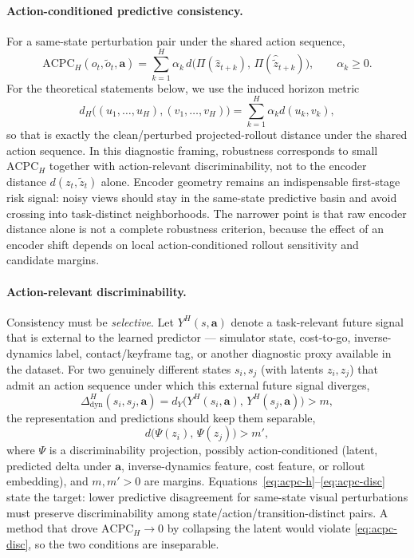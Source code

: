\documentclass[10pt]{article}
\begin{document}
\paragraph{Action-conditioned predictive consistency.} For a same-state perturbation pair under the shared action sequence,
\begin{equation}
  \mathrm{ACPC}_H(o_t, \tilde o_t, \mathbf a)
  = \sum_{k=1}^{H} \alpha_k \, d\!\big(\Pi(\hat z_{t+k}),\, \Pi(\hat{\tilde z}_{t+k})\big),
  \qquad \alpha_k \ge 0 .
  \label{eq:acpc-h}
\end{equation}
For the theoretical statements below, we use the induced horizon metric
\begin{equation}
  d_H\big((u_1,\ldots,u_H),(v_1,\ldots,v_H)\big)
  = \sum_{k=1}^{H}\alpha_k d(u_k,v_k),
  \label{eq:acpc-horizon-metric}
\end{equation}
so that  is exactly the clean/perturbed projected-rollout distance under the shared action sequence.
In this diagnostic framing, robustness corresponds to small $\mathrm{ACPC}_H$ together with action-relevant discriminability, not to the encoder distance $d(z_t, \tilde z_t)$ alone. Encoder geometry remains an indispensable first-stage risk signal: noisy views should stay in the same-state predictive basin and avoid crossing into task-distinct neighborhoods. The narrower point is that raw encoder distance alone is not a complete robustness criterion, because the effect of an encoder shift depends on local action-conditioned rollout sensitivity and candidate margins.

\paragraph{Action-relevant discriminability.} Consistency must be \emph{selective}. Let $Y^{H}(s,\mathbf a)$ denote a task-relevant future signal that is external to the learned predictor --- simulator state, cost-to-go, inverse-dynamics label, contact/keyframe tag, or another diagnostic proxy available in the dataset. For two genuinely different states $s_i, s_j$ (with latents $z_i, z_j$) that admit an action sequence under which this external future signal diverges,
\begin{equation}
  \Delta^{H}_{\mathrm{dyn}}(s_i, s_j, \mathbf a)
  = d_Y\!\big(Y^{H}(s_i, \mathbf a),\, Y^{H}(s_j, \mathbf a)\big) > m,
  \label{eq:acpc-disc-dyn}
\end{equation}
the representation and predictions should keep them separable,
\begin{equation}
  d\!\big(\Psi(z_i),\, \Psi(z_j)\big) > m',
  \label{eq:acpc-disc}
\end{equation}
where $\Psi$ is a discriminability projection, possibly action-conditioned (latent, predicted delta under $\mathbf a$, inverse-dynamics feature, cost feature, or rollout embedding), and $m, m' > 0$ are margins. Equations~\eqref{eq:acpc-h}--\eqref{eq:acpc-disc} state the target: lower predictive disagreement for same-state visual perturbations must preserve discriminability among state/action/transition-distinct pairs. A method that drove $\mathrm{ACPC}_H \to 0$ by collapsing the latent would violate \eqref{eq:acpc-disc}, so the two conditions are inseparable.
\end{document}
